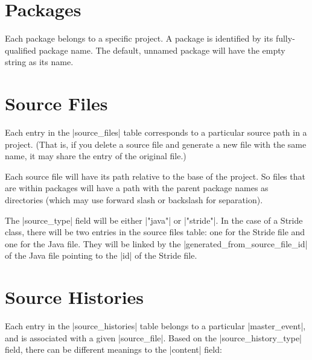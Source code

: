 \documentclass{report}
\begin{document}
\section{Packages}


Each package belongs to a specific project.  A package is identified by its
fully-qualified package name.  The default, unnamed package will have the
empty string as its name.

\section{Source Files}


Each entry in the |source_files| table corresponds to a particular
source path in a project.  (That is, if you delete a source file and
generate a new file with the same name, it may share the entry of the
original file.)

Each source file will have its path relative to the base of the
project.  So files that are within packages will have a path with the
parent package names as directories (which may use forward slash or
backslash for separation).

The |source_type| field will be either |"java"| or |"stride"|.
In the case of a Stride class, there will be two entries in the source files
table: one for the Stride file and one for the Java file.  They will be linked
by the |generated_from_source_file_id| of the Java file pointing to the |id| of the
 Stride file.

\section{Source Histories}


Each entry in the |source_histories| table belongs to a particular
|master_event|, and is associated with a given |source_file|.  Based on the
|source_history_type| field, there can be different meanings to the |content| field:
\end{document}
